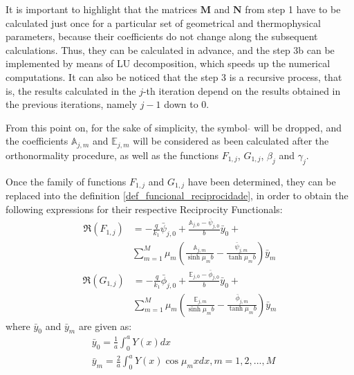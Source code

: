 \documentclass[conference,compsoc,fleqn]{IEEEtran}
\begin{document}
It is important to highlight that the matrices $\mathbf{M}$ and $\mathbf{N}$ from step 1 have to be calculated just once for a particular set of geometrical and thermophysical parameters, because their coefficients do not change along the subsequent calculations. Thus, they can be calculated in advance, and the step 3b can be implemented by means of LU decomposition, which speeds up the numerical computations. It can also be noticed that the step 3 is a recursive process, that is, the results calculated in the $j$-th iteration depend on the results obtained in the previous iterations, namely $j - 1$ down to $0$.

From this point on, for the sake of simplicity, the symbol $\hat{}$ will be dropped, and the coefficients $\mathbb{A}_{j,m}$ and $\mathbb{E}_{j,m}$ will be considered as been calculated after the orthonormality procedure, as well as the functions $F_{1,j}$, $G_{1,j}$, $\beta_j$ and $\gamma_j$.
\\


Once the family of functions $F_{1,j}$ and $G_{1,j}$ have been determined, they can be replaced into the definition \eqref{def_funcional_reciprocidade}, in order to obtain the following expressions for their respective Reciprocity Functionals:
\begin{align}
\Re(F_{1,j})
& =
-\frac{q}{k_1}\bar{\psi}_{j,0} + \frac{\mathbb{A}_{j,0} - \bar{\psi}_{j,0}}{b} \bar{y}_0 + \nonumber \\
&\sum_{m=1}^M \mu_m \left(\frac{\mathbb{A}_{j,m}}{\sinh\mu_m b} - \frac{\bar{\psi}_{j, m}}{\tanh\mu_m b}\right)\bar{y}_m
\label{calculo_FR_F1_antes_b} 
\end{align}
\begin{align}
\Re(G_{1,j})
& =
-\frac{q}{k_1}\bar{\phi}_{j,0} + \frac{\mathbb{E}_{j,0} - \bar{\phi}_{j,0}}{b} \bar{y}_0 + \nonumber \\
& \sum_{m=1}^M \mu_m \left(\frac{\mathbb{E}_{j,m}}{\sinh\mu_m b} - \frac{\bar{\phi}_{j, m}}{\tanh\mu_m b}\right)\bar{y}_m
\label{calculo_FR_G1_antes_b}
\end{align}
where $\bar{y}_0$ and $\bar{y}_m$ are given as:
\begin{align}
& \bar{y}_0 = \frac{1}{a}\int_0^a Y(x) dx \label{coef_it_0} \\ 
& \bar{y}_m = \frac{2}{a}\int_0^a Y(x) \cos\mu_m x dx, m = 1, 2, ..., M \label{coef_it_m}
\end{align}
\end{document}

